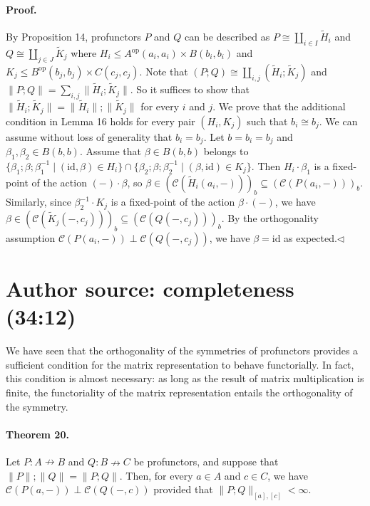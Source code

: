 \documentclass[10pt,a4paper]{article}
\newcommand{\pf}{\mathrel{\nrightarrow}}
\newcommand{\norm}[1]{\lVert#1\rVert}
\begin{document}
\paragraph{Proof.} By Proposition 14, profunctors $P$ and $Q$ can be described as $P\cong\coprod_{i\in I}\widetilde H_i$ and $Q\cong\coprod_{j\in J}\widetilde K_j$ where $H_i\le A^{\mathrm{op}}(a_i,a_i)\times B(b_i,b_i)$ and $K_j\le B^{\mathrm{op}}(b_j,b_j)\times C(c_j,c_j)$. Note that $(P;Q)\cong\coprod_{i,j}(\widetilde H_i;\widetilde K_j)$ and $\norm{P;Q}=\sum_{i,j}\norm{\widetilde H_i;\widetilde K_j}$. So it suffices to show that $\norm{\widetilde H_i;\widetilde K_j}=\norm{\widetilde H_i};\norm{\widetilde K_j}$ for every $i$ and $j$.
We prove that the additional condition in Lemma 16 holds for every pair $(H_i,K_j)$ such that $b_i\cong b_j$. We can assume without loss of generality that $b_i=b_j$. Let $b=b_i=b_j$ and $\beta_1,\beta_2\in B(b,b)$. Assume that $\beta\in B(b,b)$ belongs to $\{\beta_1;\beta;\beta_1^{-1}\mid(\mathrm{id},\beta)\in H_i\}\cap\{\beta_2;\beta;\beta_2^{-1}\mid(\beta,\mathrm{id})\in K_j\}$. Then $H_i\cdot\beta_1$ is a fixed-point of the action $(-)\cdot\beta$, so $\beta\in(\mathcal C(\widetilde H_i(a_i,-)))_b\subseteq(\mathcal C(P(a_i,-)))_b$. Similarly, since $\beta_2^{-1}\cdot K_j$ is a fixed-point of the action $\beta\cdot(-)$, we have $\beta\in(\mathcal C(\widetilde K_j(-,c_j)))_b\subseteq(\mathcal C(Q(-,c_j)))_b$. By the orthogonality assumption $\mathcal C(P(a_i,-))\perp\mathcal C(Q(-,c_j))$, we have $\beta=\mathrm{id}$ as expected.\hfill$\triangleleft$
\section*{Author source: completeness (34:12)}
We have seen that the orthogonality of the symmetries of profunctors provides a sufficient condition for the matrix representation to behave functorially. In fact, this condition is almost necessary: as long as the result of matrix multiplication is finite, the functoriality of the matrix representation entails the orthogonality of the symmetry.

\paragraph{Theorem 20.} Let $P:A\pf B$ and $Q:B\pf C$ be profunctors, and suppose that $\norm P;\norm Q=\norm{P;Q}$. Then, for every $a\in A$ and $c\in C$, we have $\mathcal C(P(a,-))\perp\mathcal C(Q(-,c))$ provided that $\norm{P;Q}_{[a],[c]}<\infty$.
\end{document}
